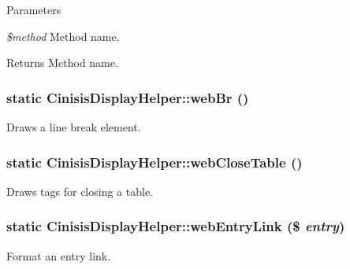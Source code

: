 \begin{DoxyParams}{Parameters}
\item[{\em \$method}]Method name.\end{DoxyParams}
\begin{DoxyReturn}{Returns}
Method name. 
\end{DoxyReturn}
\hypertarget{classCinisisDisplayHelper_a9c8b637e47e4263901baf4c5f2064d8d}{
\subsubsection[{webBr}]{\setlength{\rightskip}{0pt plus 5cm}static CinisisDisplayHelper::webBr ()}}
\label{classCinisisDisplayHelper_a9c8b637e47e4263901baf4c5f2064d8d}
Draws a line break element. \hypertarget{classCinisisDisplayHelper_ab4e55ec58b59bc8b2af32b93cdf0d7c1}{
\subsubsection[{webCloseTable}]{\setlength{\rightskip}{0pt plus 5cm}static CinisisDisplayHelper::webCloseTable ()}}
\label{classCinisisDisplayHelper_ab4e55ec58b59bc8b2af32b93cdf0d7c1}
Draws tags for closing a table. \hypertarget{classCinisisDisplayHelper_a7ffe33c336d0b495807a2c4bae78cbfb}{
\subsubsection[{webEntryLink}]{\setlength{\rightskip}{0pt plus 5cm}static CinisisDisplayHelper::webEntryLink (\$ {\em entry})}}
\label{classCinisisDisplayHelper_a7ffe33c336d0b495807a2c4bae78cbfb}
Format an entry link.


